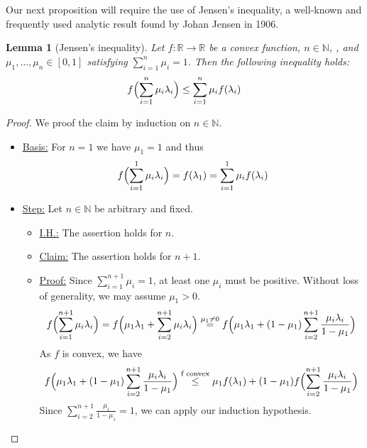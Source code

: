 \documentclass[hidelinks]{article}
\theoremstyle{plain}
\newtheorem{lem}[thm]{Lemma}
\theoremstyle{definition}
\theoremstyle{rem}
\begin{document}
Our next proposition will require the use of Jensen's inequality, a well-known and frequently used analytic result found by Johan Jensen in 1906.
\begin{lem}[Jensen's inequality]
Let $f:\mathbb{R}\rightarrow\mathbb{R}$ be a convex function, $n\in\mathbb{N}$, , and $\mu_1,\ldots,\mu_n\in[0,1]$ satisfying $\sum\limits_{i=1}^{n}\mu_i=1$. Then the following inequality holds:
\begin{equation*}
	f\Bigl(\sum_{i=1}^n \mu_i \lambda_i\Bigr) \leq \sum_{i=1}^n \mu_i f(\lambda_i)
\end{equation*}
\end{lem}
\begin{proof}
We proof the claim by induction on $n\in\mathbb{N}$.
\begin{itemize}
\item\underline{Basis:} For $n=1$ we have $\mu_1=1$ and thus
\begin{equation*}
	f\Bigl(\sum\limits_{i=1}^1\mu_i\lambda_i\Bigr)=f(\lambda_1)=\sum\limits_{i=1}^1\mu_if(\lambda_i)
\end{equation*}
\item\underline{Step:} Let $n\in\mathbb{N}$ be arbitrary and fixed.
\begin{itemize}
	\item\underline{I.H.:} The assertion holds for $n$.
	\item\underline{Claim:} The assertion holds for $n+1$.
	\item\underline{Proof:} Since $\sum\limits_{i=1}^{n+1}\mu_i=1$, at least one $\mu_i$ must be positive. Without loss of generality, we may assume $\mu_1>0$.
	\begin{equation*}
		f\Bigl(\sum\limits_{i=1}^{n+1}\mu_i\lambda_i\Bigr)=f\Bigl(\mu_1\lambda_1+\sum\limits_{i=2}^{n+1}\mu_i\lambda_i\Bigr)\stackrel{\mu_1\neq 0}{=}f\Bigl(\mu_1\lambda_1+(1-\mu_1)\sum\limits_{i=2}^{n+1}\frac{\mu_i\lambda_i}{1-\mu_1}\Bigr)
	\end{equation*}
	As $f$ is convex, we have
	\begin{equation*}
		f\Bigl(\mu_1\lambda_1+(1-\mu_1)\sum\limits_{i=2}^{n+1}\frac{\mu_i\lambda_i}{1-\mu_1}\Bigr)\stackrel{\text{f convex}}{\le} \mu_1f(\lambda_1)+(1-\mu_1)f\Bigl(\sum\limits_{i=2}^{n+1}\frac{\mu_i\lambda_i}{1-\mu_1}\Bigr)
	\end{equation*}
	Since $\sum\limits_{i=2}^{n+1}\frac{\mu_i}{1-\mu_1}=1$, we can apply our induction hypothesis.
	\begin{equation*}

\end{equation*}
\end{itemize}
\end{itemize}
\end{proof}
\end{document}
